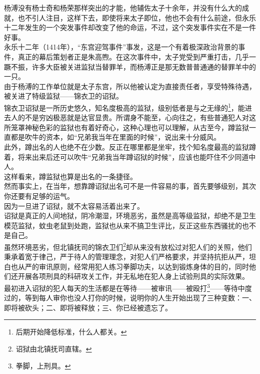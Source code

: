 \begin{multicols}{\theparacolNo}
杨溥没有杨士奇和杨荣那样突出的才能，他辅佐太子十余年，并没有什么大的成就，也不引人注目，这样下去，即使将来太子即位，他也不会有什么前途，但永乐十二年发生的一个突发事件却改变了他的命运，不过，这个突发事件实在不是一件好事。\\

永乐十二年（1414年），“东宫迎驾事件”事发，这是一个有着极深政治背景的事件，真正的幕后策划者正是朱高煦。在这次事件中，太子党受到严重打击，几乎一蹶不振，许多大臣被关进监狱当替罪羊，而杨溥正是那无数普普通通的替罪羊中的一只。\\

由于杨溥的工作单位就是太子东宫，所以他被认定为直接责任者，享受特殊待遇，被关进了特级监狱——锦衣卫的诏狱。\\

锦衣卫诏狱是一所历史悠久，知名度极高的监狱，级别低者是与之无缘的\footnote{后期开始降低标准，什么人都关。}，能进去人的不是穷凶极恶就是达官显贵。所谓身不能至，心向往之，有些普通犯人对这所笼罩神秘色彩的监狱也有着好奇心，这种心理也可以理解，从古至今，蹲监狱一直都是吹牛的资本，如“兄弟我当年在里面的时候”，说出来十分威风。\\

此外，蹲出名的人也绝不在少数。反正在哪里都是坐牢，找个知名度最高的监狱蹲着，将来出来后还可以吹牛“兄弟我当年蹲诏狱的时候”，应该也能吓住不少同道中人。\\

这样看来，蹲监狱也算是出名的一条捷径。\\

然而事实上，在当年，想靠蹲诏狱出名可不是一件容易的事，首先要够级别，其次你还要有足够的运气。\\

因为一旦进了诏狱，就不太容易活着出来了。\\

诏狱是真正的人间地狱，阴冷潮湿，环境恶劣，虽然是高等级监狱，却绝不是卫生模范监狱，蚊虫老鼠到处跑，监狱也从来不搞卫生评比，反正这些东西骚扰的也不是自己。\\

虽然环境恶劣，但北镇抚司的锦衣卫们\footnote{诏狱由北镇抚司直辖。}却从来没有放松过对犯人们的关照，他们秉承着宽于律己，严于待人的管理理念，对犯人们严格要求，并坚持抗拒从严，坦白也从严的审讯原则，经常用犯人练习拳脚功夫，以达到锻炼身体的目的，同时他们还开展各项刑具的科研攻关工作，并无私地在犯人身上试验刑具的实际效果。\\

最初进入诏狱的犯人每天的生活都是在等待——被审讯——被殴打\footnote{拳脚，上刑具。}——等待中度过的，等到每人审你也没人打你的时候，说明你的人生开始出现了三种变数：一、即将被砍头；二、即将被释放；三、你已经被遗忘了。\\


\end{multicols}
